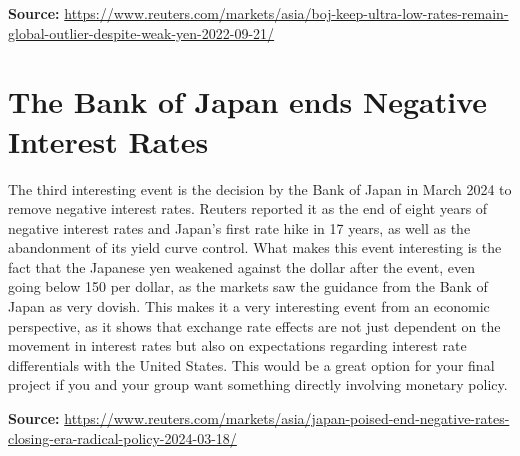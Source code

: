 \documentclass[11pt]{article}
\begin{document}
\textbf{Source:} \url{https://www.reuters.com/markets/asia/boj-keep-ultra-low-rates-remain-global-outlier-despite-weak-yen-2022-09-21/}

\section*{The Bank of Japan ends Negative Interest Rates}

The third interesting event is the decision by the Bank of Japan in March 2024 to remove negative interest rates. Reuters reported it as the end of eight years of negative interest rates and Japan's first rate hike in 17 years, as well as the abandonment of its yield curve control. What makes this event interesting is the fact that the Japanese yen weakened against the dollar after the event, even going below 150 per dollar, as the markets saw the guidance from the Bank of Japan as very dovish. This makes it a very interesting event from an economic perspective, as it shows that exchange rate effects are not just dependent on the movement in interest rates but also on expectations regarding interest rate differentials with the United States. This would be a great option for your final project if you and your group want something directly involving monetary policy.

\textbf{Source:} \url{https://www.reuters.com/markets/asia/japan-poised-end-negative-rates-closing-era-radical-policy-2024-03-18/}
\end{document}

